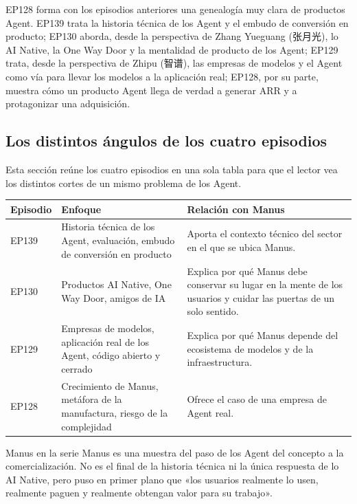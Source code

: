 \documentclass[a4paper]{article}
\begin{document}
EP128 forma con los episodios anteriores una genealogía muy clara de productos Agent. EP139 trata la historia técnica de los Agent y el embudo de conversión en producto; EP130 aborda, desde la perspectiva de Zhang Yueguang (张月光), lo AI Native, la One Way Door y la mentalidad de producto de los Agent; EP129 trata, desde la perspectiva de Zhipu (智谱), las empresas de modelos y el Agent como vía para llevar los modelos a la aplicación real; EP128, por su parte, muestra cómo un producto Agent llega de verdad a generar ARR y a protagonizar una adquisición.

\subsection{Los distintos ángulos de los cuatro episodios}

Esta sección reúne los cuatro episodios en una sola tabla para que el lector vea los distintos cortes de un mismo problema de los Agent.

\begin{longtable}{p{}p{}p{}}
\toprule
Episodio & Enfoque & Relación con Manus \\
\midrule
EP139 & Historia técnica de los Agent, evaluación, embudo de conversión en producto & Aporta el contexto técnico del sector en el que se ubica Manus. \\
EP130 & Productos AI Native, One Way Door, amigos de IA & Explica por qué Manus debe conservar su lugar en la mente de los usuarios y cuidar las puertas de un solo sentido. \\
EP129 & Empresas de modelos, aplicación real de los Agent, código abierto y cerrado & Explica por qué Manus depende del ecosistema de modelos y de la infraestructura. \\
EP128 & Crecimiento de Manus, metáfora de la manufactura, riesgo de la complejidad & Ofrece el caso de una empresa de Agent real. \\
\bottomrule
\end{longtable}

\begin{importantbox}{Manus en la serie}
Manus es una muestra del paso de los Agent del concepto a la comercialización. No es el final de la historia técnica ni la única respuesta de lo AI Native, pero puso en primer plano que «los usuarios realmente lo usen, realmente paguen y realmente obtengan valor para su trabajo».
\end{importantbox}
\end{document}
